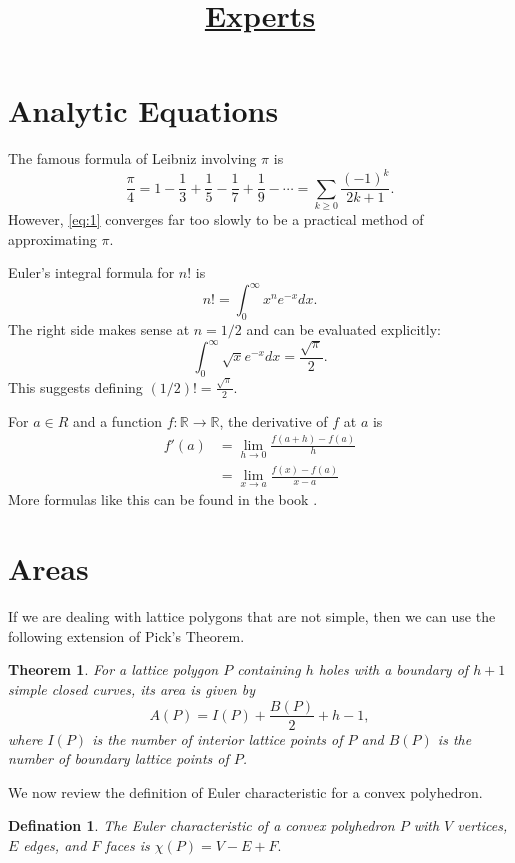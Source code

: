 \documentclass{article}
\title{\textbf{\huge \underline{Experts}}}
\date{}
\newtheorem{theorem}{Theorem}[section]
\newtheorem{defination}{Defination}[section]
\begin{document}
	\maketitle
	\section{Analytic Equations}
	The famous formula of Leibniz involving $\pi$ is
	\begin{equation}
		\label{eq:1}
		\frac{\pi}{4} = 1-\frac{1}{3}+\frac{1}{5}-\frac{1}{7}+\frac{1}{9}-\cdots=\sum_{k\ge 0}^{} \frac{(-1)^k}{2k+1}.
	\end{equation}
	However, \eqref{eq:1} converges far too slowly to be a practical method of approximating $\pi$.
	
	Euler’s integral formula for $n!$ is
	\begin{equation*}
		n!=\int_{0}^{\infty} x^n e^{-x} dx.
	\end{equation*}
	The right side makes sense at $n = 1/2$ and can be evaluated explicitly:
	\begin{equation*}
		\int_{0}^{\infty} \sqrt{x} e^{-x} dx=\frac{\sqrt{\pi}}{2}.
	\end{equation*}
	This suggests defining $(1/2)! = \frac{\sqrt{\pi}}{2}$.
	
	For $a \in R$ and a function $f : \mathbb{R} \rightarrow \mathbb{R}$, the derivative of $f$ at $a$ is
	\begin{align*}
		f'(a) &= \lim_{h\rightarrow0} \frac{f(a+h)-f(a)}{h} \\
		&= \lim_{x\rightarrow a} \frac{f(x)-f(a)}{x-a}
	\end{align*}
	More formulas like this can be found in the book \cite[\textcolor{red}{Rud76}]{Ru76}.
	\section{Areas}
	If we are dealing with lattice polygons that are not simple, then we can use the following
	extension of Pick's Theorem.
	\begin{theorem}
		\label{th:1}
			For a lattice polygon $P$ containing $h$ holes with a boundary of $h + 1$ simple closed curves, its area is given by
			\[
				A(P)=I(P)+\frac{B(P)}{2}+h-1,
			\]
			where $I(P)$ is the number of interior lattice points of $P$ and $B(P)$ is the number of boundary
			lattice points of $P$.
	\end{theorem}

	We now review the definition of Euler characteristic for a convex polyhedron.
	\begin{defination}
		The Euler characteristic of a convex polyhedron $P$ with $V$ vertices, $E$
		edges, and $F$ faces is $\chi(P) = V - E + F.$
	\end{defination}
\end{document}
